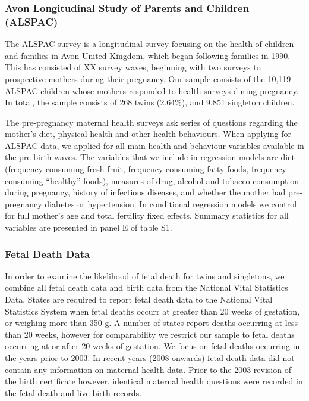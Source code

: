 \documentclass{nature}
\begin{document}
\begin{linenumbers}
\subsubsection{Avon Longitudinal Study of Parents and Children (ALSPAC)}
The ALSPAC survey is a longitudinal survey focusing on the health of children and families in Avon United Kingdom, which began following families in 1990.  This has consisted of XX survey waves, beginning with two surveys to prospective mothers during their pregnancy.  Our sample consists of the 10,119 ALSPAC children whose mothers responded to health surveys during pregnancy.  In total, the sample consists of 268 twins (2.64\%), and 9,851 singleton children.

The pre-pregnancy maternal health surveys ask series of questions regarding the mother's diet, physical health and other health behaviours.  When applying for ALSPAC data, we applied for all main health and behaviour variables available in the pre-birth waves.  The variables that we include in regression models are diet (frequency consuming fresh fruit, frequency consuming fatty foods, frequency consuming ``healthy'' foods), measures of drug, alcohol and tobacco consumption during pregnancy, history of infectious diseases, and whether the mother had pre-pregnancy diabetes or hypertension.  In conditional regression models we control for full mother's age and total fertility fixed effects.  Summary statistics for all variables are presented in panel E of table S1.

\subsubsection{Fetal Death Data}
In order to examine the likelihood of fetal death for twins and singletons, we combine all fetal death data and birth data from the National Vital Statistics Data.   States are required to report fetal death data to the National Vital Statistics System when fetal deaths occurr at greater than 20 weeks of gestation, or weighing more than 350 g. A number of states report deaths occurring at less than 20 weeks, however for comparability we restrict our sample to fetal deaths occurring at or after 20 weeks of gestation.  We focus on fetal deaths occurring in the years prior to 2003.  In recent years (2008 onwards) fetal death data did not contain any information on maternal health data.  Prior to the 2003 revision of the birth certificate however, identical maternal health questions were recorded in the fetal death and live birth records.


\end{linenumbers}
\end{document}
